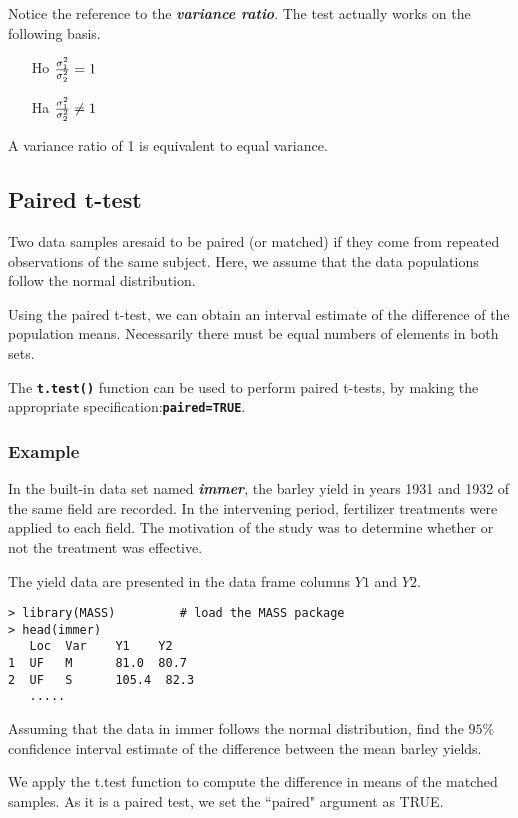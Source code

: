 \documentclass[a4paper,12pt]{article}
\begin{document}
Notice the reference to the \emph{\textbf{variance ratio}}. The test actually works on the following basis.

\begin{itemize}
\item[Ho] ${ \sigma^2_1 \over \sigma^2_2} = 1$
\item[Ha] ${ \sigma^2_1 \over \sigma^2_2} \neq 1$
\end{itemize}
A variance ratio of 1 is equivalent to equal variance.
\subsection{Paired t-test}
Two data samples aresaid to be paired (or matched) if they come from repeated observations of the same subject. Here, we assume that the data populations follow the normal distribution.

Using the paired t-test, we can obtain an interval estimate of the difference of the population means. Necessarily there must be equal numbers of elements in both sets.

The \textbf{\texttt{t.test()}} function can be used to perform paired t-tests, by making the appropriate specification:\textbf{\texttt{paired=TRUE}}.


\subsubsection{Example}
In the built-in data set named \textbf{\emph{immer}}, the barley yield in years 1931 and 1932 of the same field are recorded. In the intervening period, fertilizer treatments were applied to each field. The motivation of the study was to determine whether or not the treatment was effective.

The yield data are presented in the data frame columns $Y1$ and $Y2$.

\begin{verbatim}
> library(MASS)         # load the MASS package
> head(immer)
   Loc  Var    Y1    Y2
1  UF   M      81.0  80.7
2  UF   S      105.4  82.3
   .....
\end{verbatim}
Assuming that the data in immer follows the normal distribution, find the $95\%$ confidence interval estimate of the difference between the mean barley yields.

We apply the t.test function to compute the difference in means of the matched samples. As it is a paired test, we set the ``paired" argument as TRUE.
\end{document}
